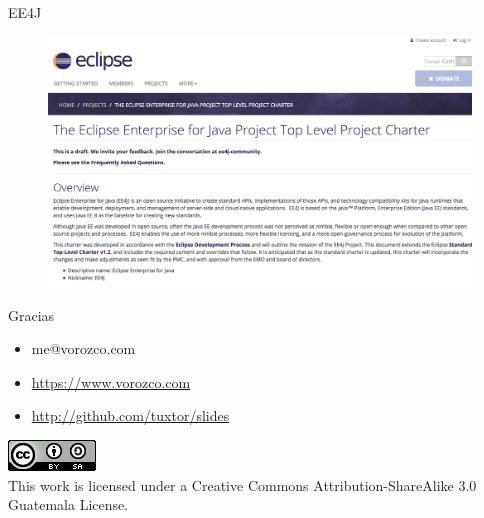 \documentclass{beamer}
\begin{document}
\begin{frame}{EE4J}
\begin{figure}
	\centering
	\includegraphics[width=\linewidth]{Images/ee4j}
\end{figure}
\end{frame}

\begin{frame}{Gracias}
\begin{itemize}
\item me@vorozco.com
\item \url{https://www.vorozco.com}
\item \url{http://github.com/tuxtor/slides}
\end{itemize}
\begin{center}
\includegraphics[width=0.1\linewidth]{Images/cclogo}
\\
This work is licensed under a Creative Commons Attribution-ShareAlike 3.0 Guatemala License.
\end{center}
\end{frame}
\end{document}
